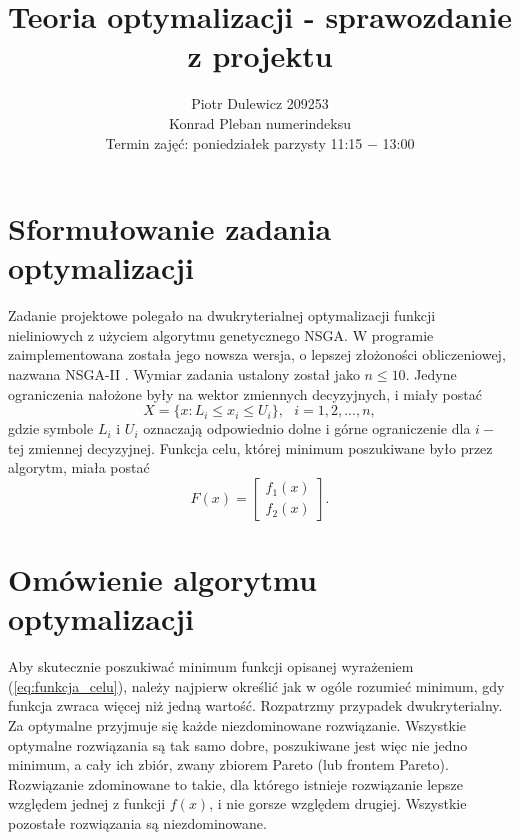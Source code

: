 \documentclass[11pt,a4paper]{article}
\title{Teoria optymalizacji - sprawozdanie z projektu}
\author{Piotr Dulewicz 209253 \\ Konrad Pleban numerindeksu \\ Termin zajęć: poniedziałek parzysty 11:15 \(-\) 13:00}
\date{}
\begin{document}
\maketitle
\section{Sformułowanie zadania optymalizacji}
Zadanie projektowe polegało na dwukryterialnej optymalizacji funkcji nieliniowych z użyciem algorytmu genetycznego NSGA. W programie zaimplementowana została jego nowsza wersja, o lepszej złożoności obliczeniowej, nazwana NSGA-II \cite{deb}. Wymiar zadania ustalony został jako \(n \leqslant 10\). Jedyne ograniczenia nałożone były na wektor zmiennych decyzyjnych, i miały postać
\[
X =  \lbrace x : L_i \leqslant x_i \leqslant U_i \rbrace, ~~~ i = 1,2,... ,n,  
\]
gdzie symbole \(L_i\) i \(U_i\) oznaczają odpowiednio dolne i górne ograniczenie dla \(i-\)tej zmiennej decyzyjnej. Funkcja celu, której minimum poszukiwane było przez algorytm, miała postać
\begin{equation}
F(x) = \begin{bmatrix}
  f_1(x) \\
  f_2(x) 
 \end{bmatrix}.
\label{eq:funkcja_celu}
\end{equation}

\section{Omówienie algorytmu optymalizacji}
Aby skutecznie poszukiwać minimum funkcji opisanej wyrażeniem (\ref{eq:funkcja_celu}), należy najpierw określić jak w ogóle rozumieć minimum, gdy funkcja zwraca więcej niż jedną wartość. Rozpatrzmy przypadek dwukryterialny. Za optymalne przyjmuje się każde niezdominowane rozwiązanie. Wszystkie optymalne rozwiązania są tak samo dobre, poszukiwane jest więc nie jedno minimum, a cały ich zbiór, zwany zbiorem Pareto (lub frontem Pareto). Rozwiązanie zdominowane to takie, dla którego istnieje rozwiązanie lepsze względem jednej z funkcji \(f(x)\), i nie gorsze względem drugiej. Wszystkie pozostałe rozwiązania są niezdominowane. 
\end{document}

